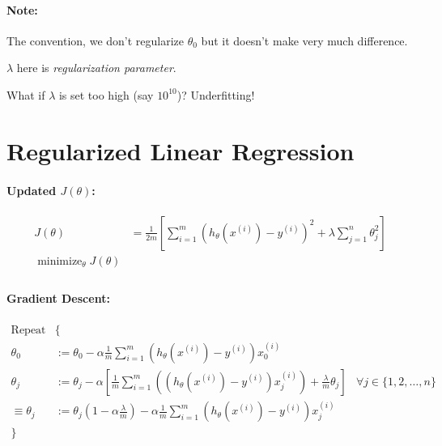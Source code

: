 \documentclass[a4paper, 12pt]{report}
\DeclareMathOperator*{\minimize}{minimize}
\begin{document}
\paragraph{Note:} The convention, we don't regularize $\theta_0$ but it doesn't
make very much difference.

$\lambda$ here is \emph{regularization parameter}.

What if $\lambda$ is set too high (say $10^{10}$)? Underfitting!

\section{Regularized Linear Regression}
\paragraph{Updated $J(\theta)$:}
\begin{align*}
	J(\theta) & = \frac{1}{2m}\left[
		\sum_{i=1}^m\left(
		h_\theta(x^{(i)}) - y^{(i)}
		\right)^2 + \lambda\sum_{j=1}^n\theta_j^2
		\right]                          \\
	\minimize_\theta J(\theta)       \\
\end{align*}

\paragraph{Gradient Descent:}
\begin{align*}
	\text{Repeat}   & \{                                                             \\
	\theta_0        & :=
	\theta_0 - \alpha \frac{1}{m} \sum_{i=1}^m(h_\theta(x^{(i)}) - y^{(i)})x_0^{(i)} \\
	\theta_j        & :=
	\theta_j - \alpha \left[
	\frac{1}{m} \sum_{i=1}^m\left(
	(h_\theta(x^{(i)}) - y^{(i)})x_j^{(i)}
	\right) + \frac{\lambda}{m}\theta_j
	\right]         & \forall j \in \{1, 2, \dots, n\}                               \\
	\equiv \theta_j & :=
	\theta_j(1 - \alpha\frac{\lambda}{m}) - \alpha\frac{1}{m}\sum_{i=1}^m(
	h_\theta(x^{(i)}) - y^{(i)}
	)x_j^{(i)}                                                                       \\
	\}
\end{align*}
\end{document}
